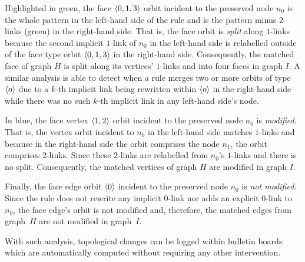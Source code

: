Highlighted in green, the face $\langle0,1,3\rangle$ orbit incident to the preserved
node $n_0$ is the whole pattern in the left-hand side of the rule and is the
pattern minus $2$-links (green) in the right-hand side. %
That is, the face orbit is \emph{split} along $1$-links because the second
implicit $1$-link of $n_0$ in the left-hand side is relabelled outside of the
face type orbit $\langle0, 1, 3\rangle$ in the right-hand side. %
Consequently, the matched face of graph $H$ is split along its vertices'
$1$-links and into four faces in graph $I$. %
A similar analysis is able to detect when a rule merges two or more orbits of
type $\langle o\rangle$ due to a $k$-th implicit link being rewritten within
$\langle o\rangle$ in the right-hand side while there was no such $k$-th implicit link
in any left-hand side's node. %

In blue, the face vertex $\langle1,2\rangle$ orbit incident to the preserved node
$n_{0}$ is \emph{modified}. %
That is, the vertex orbit incident to $n_{0}$ in the left-hand side matches
$1$-links and because in the right-hand side the orbit comprises the node
$n_{1}$, the orbit comprises $2$-links. %
Since these $2$-links are relabelled from $n_0$'s $1$-links and there is no
split. %
Consequently, the matched vertices of graph $H$ are modified in graph $I$. %

Finally, the face edge orbit $\langle0\rangle$ incident to the preserved node $n_{0}$
is \emph{not modified}. %
Since the rule does not rewrite any implicit $0$-link nor adds an explicit
$0$-link to $n_{0}$, the face edge's orbit is not modified and, therefore, the
matched edges from graph~$H$ are not modified in graph~$I$. %

With such analysis, topological changes can be logged within bulletin boards
which are automatically computed without requiring any other
intervention.


